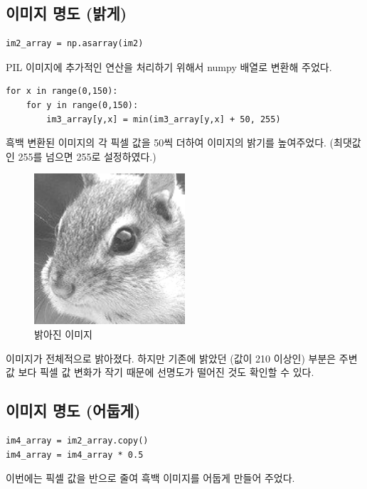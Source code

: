 \documentclass[]{report}
\begin{document}
\subsection{이미지 명도 (밝게)}
\begin{lstlisting}
im2_array = np.asarray(im2)
\end{lstlisting}
PIL 이미지에 추가적인 연산을 처리하기 위해서 numpy 배열로 변환해 주었다.\\


\begin{lstlisting}
for x in range(0,150):
	for y in range(0,150):
		im3_array[y,x] = min(im3_array[y,x] + 50, 255)
\end{lstlisting}

흑백 변환된 이미지의 각 픽셀 값을 50씩 더하여 이미지의 밝기를 높여주었다. (최댓값인 255를 넘으면 255로 설정하였다.)\\

\begin{figure}[ht!]
	\centering
	\includegraphics[width=0.5\textwidth]{chipmunk_head_bright.png}
	\caption{밝아진 이미지}
\end{figure}

이미지가 전체적으로 밝아졌다. 하지만 기존에 밝았던 (값이 210 이상인) 부분은 주변 값 보다 픽셀 값 변화가 작기 때문에 선명도가 떨어진 것도 확인할 수 있다. \\

\subsection{이미지 명도 (어둡게)}

\begin{lstlisting}
im4_array = im2_array.copy()
im4_array = im4_array * 0.5
\end{lstlisting}
이번에는 픽셀 값을 반으로 줄여 흑백 이미지를 어둡게 만들어 주었다.\\
\end{document}
